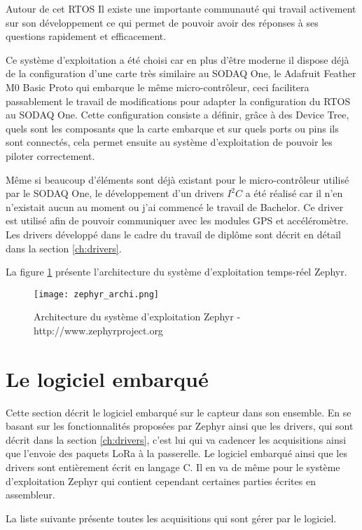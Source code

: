 Autour de cet RTOS Il existe une importante communauté qui travail activement sur son développement ce qui permet de pouvoir avoir des réponses à ses questions rapidement et efficacement.

Ce système d'exploitation a été choisi car en plus d'être moderne il dispose déjà de la configuration d'une carte très similaire au SODAQ One, le Adafruit Feather M0 Basic Proto qui embarque le même micro-contrôleur, ceci facilitera passablement le travail de modifications pour adapter la configuration du RTOS au SODAQ One. Cette configuration consiste a définir, grâce à des Device Tree, quels sont les composants que la carte embarque et sur quels ports ou pins ils sont connectés, cela permet ensuite au système d'exploitation de pouvoir les piloter correctement.

Même si beaucoup d'éléments sont déjà existant pour le micro-contrôleur utilisé par le SODAQ One, le développement d'un drivers $I^{2}C$ a été réalisé car il n'en n'existait aucun au moment ou j'ai commencé le travail de Bachelor. Ce driver est utilisé afin de pouvoir communiquer avec les modules GPS et accéléromètre. Les drivers développé dans le cadre du travail de diplôme sont décrit en détail dans la section \ref{ch:drivers}.

La figure \ref{fig:zephyr_archi} présente l'architecture du système d'exploitation temps-réel Zephyr.

\begin{figure}[htb]
\centering 
\texttt{[image: zephyr\_archi.png]} 
\caption{Architecture du système d'exploitation Zephyr - http://www.zephyrproject.org}
\label{fig:zephyr_archi}
\end{figure}

\section{Le logiciel embarqué}

Cette section décrit le logiciel embarqué sur le capteur dans son ensemble. En se basant sur les fonctionnalités proposées par Zephyr ainsi que les drivers, qui sont décrit dans la section \ref{ch:drivers}, c'est lui qui va cadencer les acquisitions ainsi que l'envoie des paquets LoRa à la passerelle. Le logiciel embarqué ainsi que les drivers sont entièrement écrit en langage C. Il en va de même pour le système d'exploitation Zephyr qui contient cependant certaines parties écrites en assembleur.

La liste suivante présente toutes les acquisitions qui sont gérer par le logiciel.

